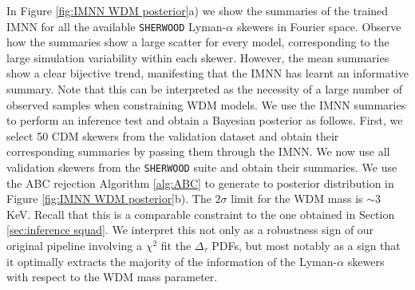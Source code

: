 In Figure \ref{fig:IMNN WDM posterior}a) we show the summaries of the trained IMNN for all the available \texttt{SHERWOOD} Lyman-$\alpha$ skewers in Fourier space. Observe how the summaries show a large scatter for every model, corresponding to the large simulation variability within each skewer. However, the mean summaries show a clear bijective trend, manifesting that the IMNN has learnt an informative summary. Note that this can be interpreted as the necessity of a large number of observed samples when constraining WDM models.
We use the IMNN summaries to perform an inference test and obtain a Bayesian posterior as follows. First, we select 50 CDM skewers from the validation dataset and obtain their corresponding summaries by passing them through the IMNN. We now use all validation skewers from the \texttt{SHERWOOD} suite and obtain their summaries. We use the ABC rejection Algorithm \ref{alg:ABC} to generate to posterior distribution in Figure \ref{fig:IMNN WDM posterior}b). The $2\sigma$ limit for the WDM mass is $\sim 3$ KeV. Recall that this is a comparable constraint to the one obtained in Section \ref{sec:inference squad}. We interpret this not only as a robustness sign of our original pipeline involving a $\chi^2$ fit the $\Delta_\tau$ PDFs, but most notably as a sign that it optimally extracts the majority of the information of the Lyman-$\alpha$ skewers with respect to the WDM mass parameter.

























